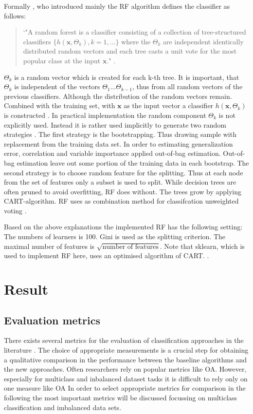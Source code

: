 \documentclass[12pt, a4paper, titlepage]{article}
\begin{document}
Formally \citet{breiman2001}, who introduced mainly the \ac{RF} algorithm defines the classifier as follows:

\begin{quote}
`"A random forest is a classifier consisting of a collection of tree-structured classifiers $\{h(\textbf{x}, \Theta_k), k = 1, ...\}$ where the ${\Theta_k}$ are independent identically distributed random vectors and each tree casts a unit vote for the most popular class at the input $\textbf{x}$." \citep[6]{breiman2001}. 
\end{quote}
$\Theta_k$ is a random vector which is created for each k-th tree. It is important, that $\Theta_k$ is independent of the vectors $\Theta_1...\Theta_{k-1}$, thus from all random vectors of the previous classifiers. Although the distribution of the random vectors remain. Combined with the training set, with $\textbf{x}$ as the input vector a classifier $h(\textbf{x}, \Theta_k)$ is constructed \citep{breiman2001}. In practical implementation the random component $\Theta_k$ is not explicitly used. Instead it is rather used implicitly to generate two random strategies \citep{cutler2012}. The first strategy is the bootstrapping. Thus drawing sample with replacement from the training data set. In order to estimating generalization error, correlation and variable importance \citet{breiman2001} applied out-of-bag estimation. Out-of-bag estimation leave out some portion of the training data in each bootstrap. The second strategy is to choose random feature for the splitting. Thus at each node from the set of features only a subset is used to split. While decision trees are often pruned to avoid overfitting, \ac{RF} does without. The trees grow by applying \ac{CART}-algorithm. \ac{RF} uses as combination method for classifcation unweighted voting \citep{cutler2012}.

Based on the above explanations the implemented \ac{RF} has the following setting: The numbers of learners is 100. Gini is used as the splitting criterion. The maximal number of features is $\sqrt{\text{number of features}}$. Note that sklearn, which is used to implement \ac{RF} here, uses an optimised algorithm of \ac{CART}. \citep{scikit-learn}.

 

\section{Result}
\subsection{Evaluation metrics}
There exists several metrics for the evaluation of classification approaches in the literature \citep{Fatourechi2008}. The choice of appropriate measurements is a crucial step for obtaining a qualitative comparison in the performance between the baseline algorithms and the new approaches. Often researchers rely on popular metrics like \ac{OA}. However, especially for multiclass and inbalanced dataset tasks it is difficult to rely only on one measure like \ac{OA} In order to select appropriate metrics for comparison in the following the most important metrics will be discussed focussing on multiclass classification and imbalanced data sets. 
\end{document}
